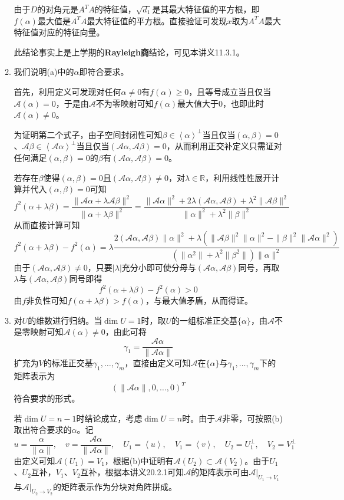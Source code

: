 \documentclass[a4paper,UTF8,fontset=windows,AutoFakeBold]{ctexart}
\newcommand*{\ma}{\mathcal{A}}
\newcommand*{\note}{\noindent *}
\begin{document}
\begin{enumerate}
\begin{enumerate}
        \note 由于$D$的对角元是$A^TA$的特征值，$\sqrt{d_1}$是其最大特征值的平方根，即$f(\alpha)$最大值是$A^TA$最大特征值的平方根。直接验证可发现$x$取为$A^TA$最大特征值对应的特征向量。
        
        \note 此结论事实上是上学期的\textbf{Rayleigh商}结论，可见本讲义11.3.1。

        \item
        我们说明(a)中的$\alpha$即符合要求。

        首先，利用定义可发现对任何$\alpha\ne0$有$f(\alpha)\ge0$，且等号成立当且仅当$\ma(\alpha)=0$，于是由$\ma$不为零映射可知$f(\alpha)$最大值大于0，也即此时$\ma(\alpha)\ne0$。

        为证明第二个式子，由子空间封闭性可知$\beta\in\left<\alpha\right>^\bot$当且仅当$(\alpha,\beta)=0$、$\ma\beta\in\left<\ma\alpha\right>^\bot$当且仅当$(\ma\alpha,\ma\beta)=0$，从而利用正交补定义只需证对任何满足$(\alpha,\beta)=0$的$\beta$有$(\ma\alpha,\ma\beta)=0$。

        若存在$\beta$使得$(\alpha,\beta)=0$且$(\ma\alpha,\ma\beta)\ne0$，对$\lambda\in\mathbb{R}$，利用线性性展开计算并代入$(\alpha,\beta)=0$可知
        $$f^2(\alpha+\lambda\beta)=\frac{\|\ma\alpha+\lambda\ma\beta\|^2}{\|\alpha+\lambda\beta\|^2}=\frac{\|\ma\alpha\|^2+2\lambda(\ma\alpha,\ma\beta)+\lambda^2\|\ma\beta\|^2}{\|\alpha\|^2+\lambda^2\|\beta\|^2}$$
        从而直接计算可知
        $$f^2(\alpha+\lambda\beta)-f^2(\alpha)=\lambda\frac{2(\ma\alpha,\ma\beta)\|\alpha\|^2+\lambda(\|\ma\beta\|^2\|\alpha\|^2-\|\beta\|^2\|\ma\alpha\|^2)}{(\|\alpha^2\|+\lambda^2\|\beta^2\|)\|\alpha\|^2}$$
        由于$(\ma\alpha,\ma\beta)\ne0$，只要$|\lambda|$充分小即可使分母与$(\ma\alpha,\ma\beta)$同号，再取$\lambda$与$(\ma\alpha,\ma\beta)$同号即得
        $$f^2(\alpha+\lambda\beta)-f^2(\alpha)>0$$
        由$f$非负性可知$f(\alpha+\lambda\beta)>f(\alpha)$，与最大值矛盾，从而得证。

        \item
        对$U$的维数进行归纳。当$\dim U=1$时，取$U$的一组标准正交基$\{\alpha\}$，由$\ma$不是零映射可知$\ma(\alpha)\ne0$，由此可将
        $$\gamma_1=\frac{\ma\alpha}{\|\ma\alpha\|}$$
        扩充为$V$的标准正交基$\gamma_1,\dots,\gamma_m$，直接由定义可知$\ma$在$\{\alpha\}$与$\gamma_1,\dots,\gamma_m$下的矩阵表示为
        $$(\|\ma\alpha\|,0,\dots,0)^T$$
        符合要求的形式。

        若$\dim U=n-1$时结论成立，考虑$\dim U=n$时。由于$\ma$非零，可按照(b)取出符合要求的$\alpha$。记
        $$u=\frac{\alpha}{\|\alpha\|},\quad v=\frac{\ma\alpha}{\|\ma\alpha\|},\quad U_1=\left<u\right>,\quad V_1=\left<v\right>,\quad U_2=U_1^\bot,\quad V_2=V_1^\bot$$
        由定义可知$\ma(U_1)=V_1$，根据(b)中证明有$\ma(U_2)\subset\ma(V_2)$。由于$U_1$、$U_2$互补，$V_1$、$V_2$互补，根据本讲义20.2.1可知$\ma$的矩阵表示可由$\ma|_{U_1\to V_1}$与$\ma|_{U_2\to V_2}$的矩阵表示作为分块对角阵拼成。


\end{enumerate}
\end{enumerate}
\end{document}
